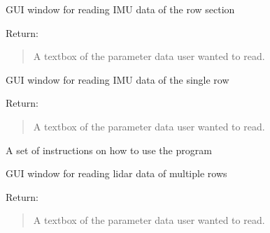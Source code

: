 \documentclass[letterpaper,10pt,english]{sphinxmanual}
\begin{document}

\begin{fulllineitems}
\label{\detokenize{Lidar extraction tool:test_lidar_gui.imu_row_section}}
GUI window for reading IMU data of the row section

Return:
\begin{quote}

A textbox of the parameter data user wanted to read.
\end{quote}

\end{fulllineitems}


\begin{fulllineitems}
\label{\detokenize{Lidar extraction tool:test_lidar_gui.imu_single_row}}
GUI window for reading IMU data of the single row

Return:
\begin{quote}

A textbox of the parameter data user wanted to read.
\end{quote}

\end{fulllineitems}


\begin{fulllineitems}
\label{\detokenize{Lidar extraction tool:test_lidar_gui.instruction}}
A set of instructions on how to use the program

\end{fulllineitems}


\begin{fulllineitems}
\label{\detokenize{Lidar extraction tool:test_lidar_gui.lidar_multiple_row}}
GUI window for reading lidar data of multiple rows

Return:
\begin{quote}

A textbox of the parameter data user wanted to read.
\end{quote}

\end{fulllineitems}
\end{document}
